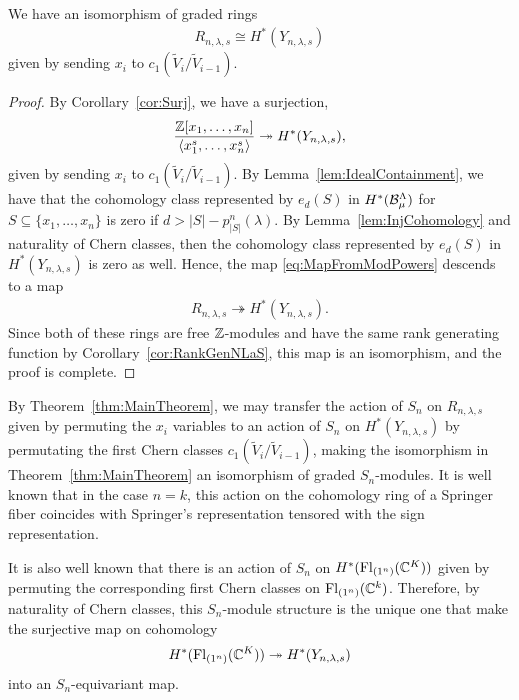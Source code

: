 \documentclass[12pt]{amsart}
\newcommand{\Fl}{\mathrm{Fl}}
\newcommand{\la}{\lambda}
\begin{document}
\begin{theorem}\label{thm:MainTheorem}
We have an isomorphism of graded rings
\begin{align}
R_{n,\la,s} \cong H^*(Y_{n,\la,s})
\end{align}
given by sending $x_i$ to $c_1(\widetilde V_{i}/\widetilde V_{i-1})$.
\end{theorem}

\begin{proof}
By Corollary~\ref{cor:Surj}, we have a surjection,
\begin{align}\label{eq:MapFromModPowers}
\frac{\bZ[x_1,\dots, x_n]}{\langle x_1^s,\dots, x_n^s\rangle} \twoheadrightarrow H^*(Y_{n,\la,s}),
\end{align}
given by sending $x_i$ to $c_1(\widetilde V_i/\widetilde V_{i-1})$. By Lemma~\ref{lem:IdealContainment}, we have that the cohomology class represented by $e_d(S)$ in $H^*(\mathcal{B}_\mu^\Lambda)$ for $S\subseteq \{x_1,\dots, x_n\}$ is zero if $d>|S| - p^n_{|S|}(\la)$. By Lemma~\ref{lem:InjCohomology} and naturality of Chern classes, then the cohomology class represented by $e_d(S)$ in $H^*(Y_{n,\la,s})$ is zero as well. Hence, the map \eqref{eq:MapFromModPowers} descends to a map
\begin{align}
R_{n,\la,s} \twoheadrightarrow H^*(Y_{n,\la,s}).
\end{align}
Since both of these rings are free $\mathbb{Z}$-modules and have the same rank generating function by Corollary~\ref{cor:RankGenNLaS}, this map is an isomorphism, and the proof is complete.
\end{proof}


By Theorem~\ref{thm:MainTheorem}, we may transfer the action of $S_n$ on $R_{n,\la,s}$ given by permuting the $x_i$ variables to an action of $S_n$ on $H^*(Y_{n,\la,s})$ by permutating the first Chern classes $c_1(\widetilde V_i/\widetilde V_{i-1})$, making the isomorphism in Theorem~\ref{thm:MainTheorem} an isomorphism of graded $S_n$-modules. It is well known that in the case $n=k$, this action on the cohomology ring of a Springer fiber coincides with Springer's representation tensored with the sign representation.

It is also well known that there is an action of $S_n$ on $H^*(\Fl_{(1^n)}(\bC^K))$ given by permuting the corresponding first Chern classes on $\Fl_{(1^n)}(\bC^k)$. Therefore, by naturality of Chern classes, this $S_n$-module structure is the unique one that make the surjective map on cohomology
\begin{align}
  H^*(\Fl_{(1^n)}(\bC^K)) \twoheadrightarrow H^*(Y_{n,\la,s})
\end{align}
into an $S_n$-equivariant map.
\end{document}
